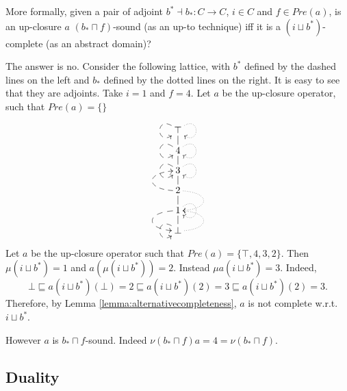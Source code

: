 \documentclass{llncs}
\begin{document}
More formally, given a pair of adjoint $b^*\dashv b_* \colon C\to C$, $i\in C$ and $f\in Pre(a)$, is an up-closure $a$ $(b_*\sqcap f)$-sound (as an up-to technique) iff it is a $(i \sqcup b^*)$-complete (as an abstract domain)?

The answer is no.  Consider the following lattice, with $b^*$ defined by the dashed lines on the left and $b_*$ defined by the dotted lines on the right. It is easy to see that they are adjoints. Take $i=1$ and $f=4$. Let $a$ be the up-closure operator, such that $Pre(a)= \{\}$

$$
\begin{array}{c}
{\lower-1.2cm\hbox{\xymatrix@R=0.3cm@C=0.3cm{  
\top \ar@{-->}@(ul,dl) \ar@{.>}@(ur,dr)  \\
4 \ar@{-->}@(ul,dl) \ar@{-}[u] \ar@{.>}@(ur,dr)   \\
3 \ar@{-->}@(ul,dl) \ar@{-}[u]  \ar@{.>}@(ur,dr)  \\
2\ar@{-}[u] \ar@{-->}@(l,l)[u] \ar@{.>}@(r,r)[d] \\
1\ar@{-}[u] \ar@{-->}@(l,l)[d] \ar@{.>}@(ur,dr)  \\
\bot \ar@{-->}@(ul,dl) \ar@{-}[u] \ar@{.>}@(r,r)[u]
}}}\end{array}
$$

Let $a$ be the up-closure operator such that $Pre(a)= \{\top, 4,3,2\}$.
Then $\mu (i \sqcup b^*) = 1$ and $a(\mu (i \sqcup b^*) ) =2$.
Instead $\mu a (i \sqcup b^*)= 3$. Indeed,
$$\bot \sqsubseteq a (i \sqcup b^*)(\bot)= 2 \sqsubseteq a (i \sqcup b^*)(2)=3 \sqsubseteq a (i \sqcup b^*)(2)=3\text{.}$$
Therefore, by Lemma \ref{lemma:alternativecompleteness}, $a$ is not complete w.r.t. $i \sqcup b^*$.

However $a$ is $b_*\sqcap f$-sound. Indeed $\nu (b_*\sqcap f)a = 4 =  \nu (b_*\sqcap f)$.




\subsection{Duality}
\end{document}
